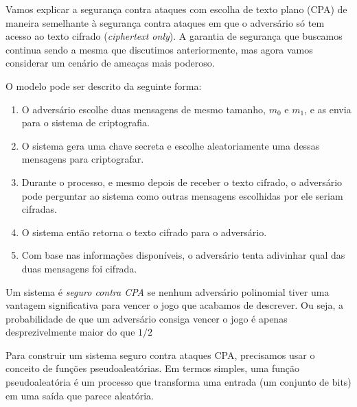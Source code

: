Vamos explicar a segurança contra ataques com escolha de texto plano (CPA) de maneira semelhante à segurança contra ataques em que o adversário só tem acesso ao texto cifrado (\textit{ciphertext only}).
A garantia de segurança que buscamos continua sendo a mesma que discutimos anteriormente, mas agora vamos considerar um cenário de ameaças mais poderoso.

O modelo pode ser descrito da seguinte forma:

\begin{enumerate}
    \item O adversário escolhe duas mensagens de mesmo tamanho, $m_0$ e $m_1$, e as envia para o sistema de criptografia.
    \item O sistema gera uma chave secreta e escolhe aleatoriamente uma dessas mensagens para criptografar.
    \item Durante o processo, e mesmo depois de receber o texto cifrado, o adversário pode perguntar ao sistema como outras mensagens escolhidas por ele seriam cifradas.
    \item O sistema então retorna o texto cifrado para o adversário.
    \item Com base nas informações disponíveis, o adversário tenta adivinhar qual das duas mensagens foi cifrada.
\end{enumerate}

\begin{center}
\end{center}

Um sistema é {\em seguro contra CPA} se nenhum adversário polinomial tiver uma vantagem significativa para vencer o jogo que acabamos de descrever.
Ou seja, a probabilidade de que um adversário consiga vencer o jogo é apenas desprezivelmente maior do que $1/2$

Para construir um sistema seguro contra ataques CPA, precisamos usar o conceito de funções pseudoaleatórias.
Em termos simples, uma função pseudoaleatória é um processo que transforma uma entrada (um conjunto de bits) em uma saída que parece aleatória.

